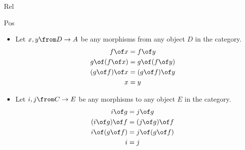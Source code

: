 \begin {definition}{Rel}
\begin{definition}{Pos}
\begin{answer}
\begin{itemize}
    \begin{minipage}{.5\linewidth}
      \[
      \begin{aligned}
        & \ \ \ \ (g \of f) \of (f^{-1} \of g^{-1})\\
        &= g \of (f \of f^{-1}) \of g^{-1} \\
        &= (g \of 1_B) \of g^{-1} \\
        &= g \of g^{-1} \\
        &= 1_C
      \end{aligned}
      \]
    \end{minipage}%
    \begin{minipage}{.5\linewidth}
      \[
      \begin{aligned}
        & \ \ \ \ (f^{-1} \of g^{-1}) \of (g \of f)\\
        &= f^{-1} \of (g^{-1} \of g) \of f\\
        &= (f^{-1} \of 1_B) \of f\\
        &= f^{-1} \of f\\
        &= 1_A
      \end{aligned}
      \]
    \end{minipage}%
    \vspace{4mm}
    \\
    $(f^{-1} \of g^{-1})$ is the inverse of $(g \of f)$.
    Therefore $h = (g \of f)$ is an isomorphism.
    \vspace{5mm}
  \item
    \raggedright Let $x, y \from D \to A$ be any morphisms
    from any object $D$ in the category. \\
    \centering
      \[
      \begin{aligned}
        f \of x &= f \of y \\
        g \of (f \of x) &= g \of (f \of y) \\
        (g \of f) \of x &= (g \of f) \of y \\
        x &= y \\
      \end{aligned}
      \]
  \item
    \raggedright Let $i, j \from C \to E$ be any morphisms
    to any object $E$ in the category.\\
    \centering
      \[
      \begin{aligned}
        i \of g &= j \of g \\
        (i \of g) \of f &= (j \of g) \of f \\
        i \of (g \of f) &= j \of (g \of f) \\
        i &= j \\
      \end{aligned}
      \]
  \end{itemize}
\end{answer}


\end{definition}
\end{definition}
